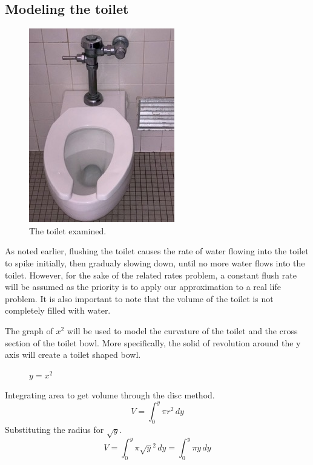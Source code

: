 \documentclass[12pt, titlepage]{article}
\begin{document}
\subsection{Modeling the toilet}
\begin{figure}[H]
\centering
  \includegraphics[angle=270]{toilet.jpeg}
    \caption{The toilet examined.}
\end{figure}

As noted earlier, flushing the toilet causes the rate of water flowing into the toilet to spike initially, then gradualy slowing down, until no more water flows into the toilet. However, for the sake of the related rates problem, a constant flush rate will be assumed as the priority is to apply our approximation to a real life problem. It is also important to note that the volume of the toilet is not completely filled with water.  

The graph of \(x^{2}\) will be used to model the curvature of the toilet and the cross section of the toilet bowl. More specifically, the solid of revolution around the y axis will create a toilet shaped bowl. 

\begin{figure}[H]
\centering
    \caption[]{\(y=x^2\)}
\end{figure}

Integrating area to get volume through the disc method.
\begin{equation*}
    V = \int^y_0 \pi r^2\,dy
\end{equation*}
Substituting the radius for \(\sqrt{y}\).
\begin{equation*}
    V = \int^y_0 \pi \sqrt{y}^2\,dy  = \int^y_0 \pi y\,dy 
\end{equation*}
\end{document}
